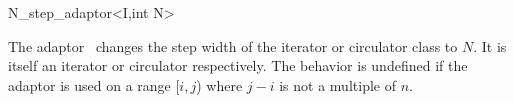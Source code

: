 \begin{ccRefClass}{N_step_adaptor<I,int N>}
  
  \ccDefinition The adaptor \ccRefName\ changes the step width of the
  iterator or circulator class  to $N$. It is itself an
  iterator or circulator respectively. The behavior is undefined if
  the adaptor is used on a range [$i,j$) where $j-i$ is not a multiple
  of $n$.
  
  
  \ccCreation
  
  
\end{ccRefClass}

